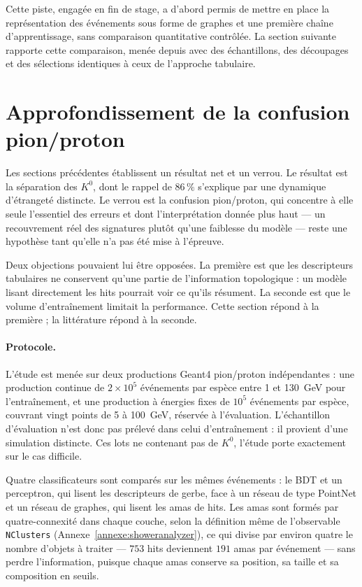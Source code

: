 Cette piste, engagée en fin de stage, a d'abord permis de mettre en place la représentation des événements sous forme de graphes et une première chaîne d'apprentissage, sans comparaison quantitative contrôlée. La section suivante rapporte cette comparaison, menée depuis avec des échantillons, des découpages et des sélections identiques à ceux de l'approche tabulaire.

\section{Approfondissement de la confusion pion/proton}
\label{sec:pid-approfondissement}

Les sections précédentes établissent un résultat net et un verrou. Le résultat est la séparation des $K^0$, dont le rappel de $86\,\%$ s'explique par une dynamique d'étrangeté distincte. Le verrou est la confusion pion/proton, qui concentre à elle seule l'essentiel des erreurs et dont l'interprétation donnée plus haut — un recouvrement réel des signatures plutôt qu'une faiblesse du modèle — reste une hypothèse tant qu'elle n'a pas été mise à l'épreuve.

Deux objections pouvaient lui être opposées. La première est que les descripteurs tabulaires ne conservent qu'une partie de l'information topologique : un modèle lisant directement les hits pourrait voir ce qu'ils résument. La seconde est que le volume d'entraînement limitait la performance. Cette section répond à la première ; la littérature répond à la seconde.

\paragraph{Protocole.} L'étude est menée sur deux productions Geant4 pion/proton indépendantes : une production continue de $2\times10^{5}$ événements par espèce entre 1 et 130~GeV pour l'entraînement, et une production à énergies fixes de $10^{5}$ événements par espèce, couvrant vingt points de 5 à 100~GeV, réservée à l'évaluation. L'échantillon d'évaluation n'est donc pas prélevé dans celui d'entraînement : il provient d'une simulation distincte. Ces lots ne contenant pas de $K^0$, l'étude porte exactement sur le cas difficile.

Quatre classificateurs sont comparés sur les mêmes événements : le BDT et un perceptron, qui lisent les descripteurs de gerbe, face à un réseau de type PointNet et un réseau de graphes, qui lisent les amas de hits. Les amas sont formés par quatre-connexité dans chaque couche, selon la définition même de l'observable \texttt{NClusters} (Annexe~\ref{annexe:showeranalyzer}), ce qui divise par environ quatre le nombre d'objets à traiter — $753$ hits deviennent $191$ amas par événement — sans perdre l'information, puisque chaque amas conserve sa position, sa taille et sa composition en seuils.

